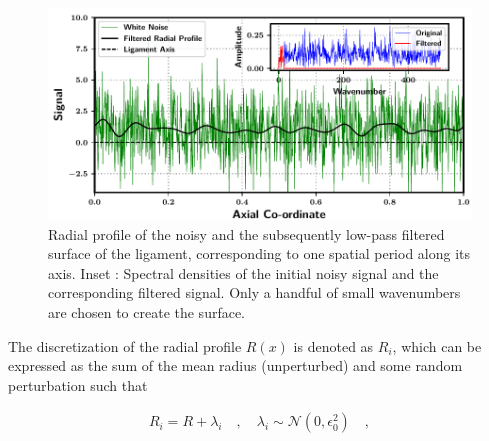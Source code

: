 \begin{figure}
\centering
\includegraphics{plots/ligament_breakup/profile.pdf}
	\caption{ Radial profile of the noisy and the subsequently 
	low-pass filtered surface of the ligament, corresponding to 
	one spatial period along its axis. 
	Inset : Spectral densities of the initial noisy signal
        and the corresponding filtered signal. Only a handful
	of small wavenumbers are chosen to create the surface. 
}
\label{surface}
\end{figure}

The discretization of the radial profile $R(x)$ is denoted as $R_i$, 
which can be expressed as the sum of the mean radius 
(unperturbed) and some random perturbation such that    

\begin{align}
	R_i = R + \lambda_i \quad , \quad \lambda_i \sim \mathcal{N}(0,\epsilon_{0}^2) \quad , 
\end{align}

